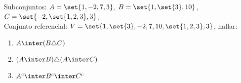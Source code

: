 \ejercicio
Subconjuntos: $A = \set{1, -2, 7, 3}$, $B = \set{1, \set{3}, 10}$, $C = \set{-2,\set{1,2,3},3}$,\\
Conjunto referencial: $V = \set{1,\set{3}, -2,7, 10, \set{1,2,3},3}$, hallar:

\begin{multicols}{2}
	\begin{enumerate}[label=(\roman*)]
		\item $A \inter (B \triangle C)$
		\item $(A \inter B) \triangle (A \inter C)$
		\item $A^c \inter B^c \inter C^c$
	\end{enumerate}
\end{multicols}
